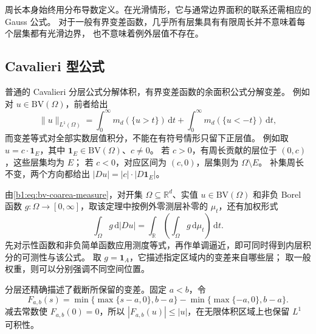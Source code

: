 周长本身始终用分布导数定义。在光滑情形，它与通常边界面积的联系还需相应的
Gauss 公式。
对于一般有界变差函数，几乎所有层集具有有限周长并不意味着每个层集都有光滑边界，
也不意味着例外层值不存在。

\subsection{Cavalieri 型公式}
\label{b1:subsec:270304}

普通的 Cavalieri 分层公式分解体积，有界变差函数的余面积公式分解变差。
例如对 \(u\in \mathrm{BV}(\Omega)\)，前者给出
\[
 \|u\|_{L^1(\Omega)}
 =\int_0^\infty m_d(\{u>t\})\,\mathrm dt
    +\int_0^\infty m_d(\{u<-t\})\,\mathrm dt,
\]
而变差等式对全部实数层值积分，不能在有符号情形只留下正层值。
例如取 \(u=c\cdot\mathbf1_E\)，其中 \(\mathbf1_E\in \mathrm{BV}(\Omega)\)、\(c\ne0\)。
若 \(c>0\)，有周长贡献的层位于 \((0,c)\)，这些层集均为 \(E\)；
若 \(c<0\)，对应区间为 \((c,0)\)，层集则为 \(\Omega\setminus E\)。
补集周长不变，两个方向都给出 \(|Du|=|c|\cdot|D\mathbf1_E|\)。

\ProseParagraphBreak

由\eqref{b1:eq:bv-coarea-measure}，对开集 \(\Omega\subseteq\mathbb R^d\)、实值 \(u\in\mathrm{BV}(\Omega)\) 和非负 Borel 函数 \(g:\Omega\to[0,\infty]\)，取该定理中按例外零测层补零的 \(\mu_t\)，还有加权形式
\begin{equation}\label{b1:eq:bv-weighted-coarea}
 \int_\Omega g\,\mathrm d|Du|
 =\int_{\mathbb R}\left(\int_\Omega g\,\mathrm d\mu_t\right)\,\mathrm dt.
\end{equation}
先对示性函数和非负简单函数应用测度等式，再作单调逼近，即可同时得到内层积分的可测性与该公式。
取 \(g=\mathbf1_A\)，它描述指定区域内的变差来自哪些层；
取一般权重，则可以分别强调不同空间位置。

\ProseParagraphBreak

分层还精确描述了截断所保留的变差。固定 \(a<b\)，令
\[
 F_{a,b}(s)=\min\bigl\{\max\{s-a,0\},b-a\bigr\}
                -\min\bigl\{\max\{-a,0\},b-a\bigr\}.
\]
减去常数使 \(F_{a,b}(0)=0\)，所以
\(|F_{a,b}(u)|\le|u|\)，在无限体积区域上也保留 \(L^1\) 可积性。

